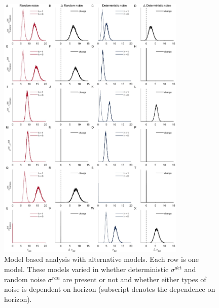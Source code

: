 \documentclass[12pt]{article}
\begin{document}
	\begin{figure}[hp]
		\begin{center}
			\includegraphics[width=0.8\textwidth]{figures/RDBayes_2noise_hyperpriors_6model.jpg}
			\caption{Model based analysis with alternative models. Each row is one model. These models varied in whether deterministic $\sigma^{det}$ and random noise $\sigma^{ran}$ are present or not and whether either types of noise is dependent on horizon (subscript denotes the dependence on horizon). }
			\label{fig:sixmodels}
		\end{center}
	\end{figure}
\end{document}
